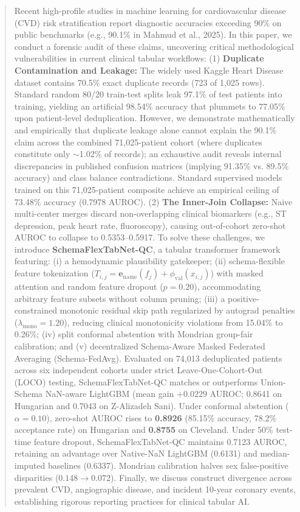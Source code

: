 \documentclass[journal]{IEEEtran}
\begin{document}
\begin{abstract}
Recent high-profile studies in machine learning for cardiovascular disease (CVD) risk stratification report diagnostic accuracies exceeding 90\% on public benchmarks (e.g., 90.1\% in Mahmud et al., 2025). In this paper, we conduct a forensic audit of these claims, uncovering critical methodological vulnerabilities in current clinical tabular workflows:
(1) \textbf{Duplicate Contamination and Leakage:} The widely used Kaggle Heart Disease dataset contains 70.5\% exact duplicate records (723 of 1,025 rows). Standard random 80/20 train-test splits leak 97.1\% of test patients into training, yielding an artificial 98.54\% accuracy that plummets to 77.05\% upon patient-level deduplication. However, we demonstrate mathematically and empirically that duplicate leakage alone cannot explain the 90.1\% claim across the combined 71,025-patient cohort (where duplicates constitute only $\sim$1.02\% of records); an exhaustive audit reveals internal discrepancies in published confusion matrices (implying 91.35\% vs. 89.5\% accuracy) and class balance contradictions. Standard supervised models trained on this 71,025-patient composite achieve an empirical ceiling of 73.48\% accuracy (0.7978 AUROC).
(2) \textbf{The Inner-Join Collapse:} Naive multi-center merges discard non-overlapping clinical biomarkers (e.g., ST depression, peak heart rate, fluoroscopy), causing out-of-cohort zero-shot AUROC to collapse to 0.5353--0.5917.
To solve these challenges, we introduce \textbf{SchemaFlexTabNet-QC}, a tabular transformer framework featuring: (i) a hemodynamic plausibility gatekeeper; (ii) schema-flexible feature tokenization ($T_{i,j} = \mathbf{e}_{\text{name}}(f_j) + \phi_{\text{val}}(x_{i,j})$) with masked attention and random feature dropout ($p=0.20$), accommodating arbitrary feature subsets without column pruning; (iii) a positive-constrained monotonic residual skip path regularized by autograd penalties ($\lambda_{\text{mono}} = 1.20$), reducing clinical monotonicity violations from 15.04\% to 0.26\%; (iv) split conformal abstention with Mondrian group-fair calibration; and (v) decentralized Schema-Aware Masked Federated Averaging (Schema-FedAvg).
Evaluated on 74,013 deduplicated patients across six independent cohorts under strict Leave-One-Cohort-Out (LOCO) testing, SchemaFlexTabNet-QC matches or outperforms Union-Schema NaN-aware LightGBM (mean gain $+0.0229$ AUROC; 0.8641 on Hungarian and 0.7043 on Z-Alizadeh Sani). Under conformal abstention ($\alpha=0.10$), zero-shot AUROC rises to \textbf{0.8926} (85.15\% accuracy, 78.2\% acceptance rate) on Hungarian and \textbf{0.8755} on Cleveland. Under 50\% test-time feature dropout, SchemaFlexTabNet-QC maintains 0.7123 AUROC, retaining an advantage over Native-NaN LightGBM (0.6131) and median-imputed baselines (0.6337). Mondrian calibration halves sex false-positive disparities ($0.148 \to 0.072$). Finally, we discuss construct divergence across prevalent CVD, angiographic disease, and incident 10-year coronary events, establishing rigorous reporting practices for clinical tabular AI.
\end{abstract}
\end{document}
